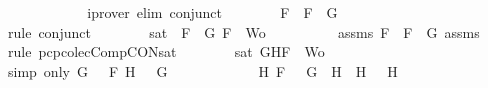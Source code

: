 \begin{isabellebody}
\ \ \ \ \ \ \ \ \isamarkupfalse%
\ {}\ \isamarkupfalse%
\ {\isacharparenleft}iprover\ elim{\isacharcolon}\ conjunct{}{\isacharparenright}\isanewline
\ \ \ \ \ \ \isamarkupfalse%
\ {\isachardoublequoteopen}F\ {\isacharequal}\ \isactrlbold {\isasymnot}{\isacharparenleft}F{}\ \isactrlbold {\isasymor}\ G{}{\isacharparenright}{\isachardoublequoteclose}\isanewline
\ \ \ \ \ \ \ \ \isamarkupfalse%
\ {}\ \isamarkupfalse%
\ {\isacharparenleft}rule\ conjunct{}{\isacharparenright}\isanewline
\ \ \ \ \ \ \isamarkupfalse%
\ {\isachardoublequoteopen}sat\ {\isacharparenleft}{\isacharbraceleft}\isactrlbold {\isasymnot}\ F{}{\isacharcomma}\ \isactrlbold {\isasymnot}\ G{}{\isacharcomma}\ F{\isacharbraceright}\ {\isasymunion}\ Wo{\isacharparenright}{\isachardoublequoteclose}\isanewline
\ \ \ \ \ \ \ \ \isamarkupfalse%
\ assms{\isacharparenleft}{}{\isacharparenright}\ {\isacartoucheopen}F\ {\isacharequal}\ \isactrlbold {\isasymnot}{\isacharparenleft}F{}\ \isactrlbold {\isasymor}\ G{}{\isacharparenright}{\isacartoucheclose}\ assms{\isacharparenleft}{}{\isacharcomma}{}{\isacharcomma}{}{\isacharparenright}\ \isamarkupfalse%
\ {\isacharparenleft}rule\ pcp{\isacharunderscore}colecComp{\isacharunderscore}CON{\isacharunderscore}sat{}{\isacharparenright}\isanewline
\ \ \ \ \ \ \isamarkupfalse%
\ {\isachardoublequoteopen}sat\ {\isacharparenleft}{\isacharbraceleft}G{\isacharcomma}H{\isacharcomma}F{\isacharbraceright}\ {\isasymunion}\ Wo{\isacharparenright}{\isachardoublequoteclose}\isanewline
\ \ \ \ \ \ \ \ \isamarkupfalse%
\ {\isacharparenleft}simp\ only{\isacharcolon}\ {\isacartoucheopen}G\ {\isacharequal}\ \isactrlbold {\isasymnot}\ F{}{\isacartoucheclose}\ {\isacartoucheopen}H\ {\isacharequal}\ \isactrlbold {\isasymnot}\ G{}{\isacartoucheclose}{\isacharparenright}\isanewline
\ \ \ \ \isamarkupfalse%
\isanewline
\ \ \ \ \ \ \isamarkupfalse%
\ {\isachardoublequoteopen}{\isacharparenleft}{\isasymexists}H{}{\isachardot}\ F\ {\isacharequal}\ \isactrlbold {\isasymnot}\ {\isacharparenleft}G\ \isactrlbold {\isasymrightarrow}\ H{}{\isacharparenright}\ {\isasymand}\ H\ {\isacharequal}\ \isactrlbold {\isasymnot}\ H{}{\isacharparenright}\ {\isasymor}\ \isanewline

\end{isabellebody}
